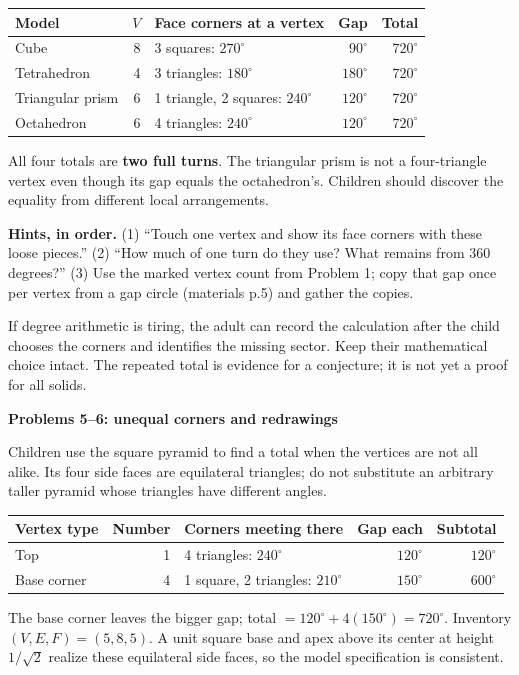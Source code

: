 \documentclass[11pt,letterpaper]{article}
\newcommand{\titleline}[1]{\par{\Large\bfseries #1}\par\vspace{4pt}}
\newcommand{\sub}[1]{\par\vspace{3pt}{\bfseries #1}\par}
\newcommand{\hints}[3]{\textbf{Hints, in order.} (1) #1 (2) #2 (3) #3\par}
\newcommand{\degc}{^{\circ}}
\begin{document}
\begin{center}
\begin{tabular}{|l|r|l|r|r|}\hline
Model & $V$ & Face corners at a vertex & Gap & Total\\\hline
Cube & 8 & 3 squares: $270\degc$ & $90\degc$ & $720\degc$\\
Tetrahedron & 4 & 3 triangles: $180\degc$ & $180\degc$ & $720\degc$\\
Triangular prism & 6 & 1 triangle, 2 squares: $240\degc$ & $120\degc$ & $720\degc$\\
Octahedron & 6 & 4 triangles: $240\degc$ & $120\degc$ & $720\degc$\\\hline
\end{tabular}
\end{center}
All four totals are \textbf{two full turns}. The triangular prism is not a four-triangle vertex even though its gap equals the octahedron's. Children should discover the equality from different local arrangements.

\hints{``Touch one vertex and show its face corners with these loose pieces.''}{``How much of one turn do they use? What remains from 360 degrees?''}{Use the marked vertex count from Problem 1; copy that gap once per vertex from a gap circle (materials p.5) and gather the copies.}
If degree arithmetic is tiring, the adult can record the calculation after the child chooses the corners and identifies the missing sector. Keep their mathematical choice intact. The repeated total is evidence for a conjecture; it is not yet a proof for all solids.

\newpage
\titleline{Problems 5--6: unequal corners and redrawings}
\sub{Problem 5 / student p.5 / further concrete work}
Children use the square pyramid to find a total when the vertices are not all alike. Its four side faces are equilateral triangles; do not substitute an arbitrary taller pyramid whose triangles have different angles.

\begin{center}
\begin{tabular}{|l|r|l|r|r|}\hline
Vertex type & Number & Corners meeting there & Gap each & Subtotal\\\hline
Top & 1 & 4 triangles: $240\degc$ & $120\degc$ & $120\degc$\\
Base corner & 4 & 1 square, 2 triangles: $210\degc$ & $150\degc$ & $600\degc$\\\hline
\end{tabular}
\end{center}
The base corner leaves the bigger gap; total $=120\degc+4(150\degc)=720\degc$. Inventory $(V,E,F)=(5,8,5)$. A unit square base and apex above its center at height $1/\sqrt2$ realize these equilateral side faces, so the model specification is consistent.
\end{document}
